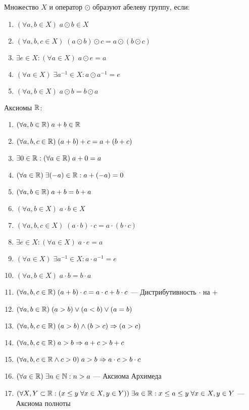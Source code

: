 \documentclass{article}
\begin{document}


Множество $X$ и оператор $\odot$ образуют абелеву группу, если:

\begin{enumerate}[label=\Roman*.]
	\item$(\forall a, b\in X)\;a\odot b\in X$
	\item$(\forall a,b,c\in X)\;(a\odot b)\odot c=a\odot(b\odot c)$
	\item$\exists e\in X:(\forall a\in X)\;a\odot e=a$
	\item$(\forall a\in X)\;\exists a^{-1}\in X:a\odot a^{-1}=e$
	\item$(\forall a, b\in X)\;a\odot b=b\odot a$
\end{enumerate}


Аксиомы $\mathbb{R}$:

\begin{enumerate}[label=\Roman*.]
	\item{}$(\forall a, b\in\mathbb{R})\;a+b\in\mathbb{R}$
	\item$(\forall a,b,c\in\mathbb{R})\;(a+b)+c=a+(b+c)$
	\item$\exists 0\in\mathbb{R}:(\forall a\in\mathbb{R})\;a+0=a$
	\item$(\forall a\in\mathbb{R})\;\exists (-a)\in\mathbb{R}:a+(-a)=0$
	\item{}$(\forall a, b\in\mathbb{R})\;a+b=b+a$
	\item{}$(\forall a, b\in X)\;a\cdot b\in X$
	\item$(\forall a,b,c\in X)\;(a\cdot b)\cdot c=a\cdot(b\cdot c)$
	\item$\exists e\in X:(\forall a\in X)\;a\cdot e=a$
	\item$(\forall a\in X)\;\exists a^{-1}\in X:a\cdot a^{-1}=e$
	\item{}$(\forall a, b\in X)\;a\cdot b=b\cdot a$
	\item$(\forall a,b,c\in\mathbb{R})\;(a+b)\cdot c=a\cdot c+b\cdot c$ --- Дистрибутивность $\cdot$ на $+$
	\item{}$(\forall a,b\in\mathbb{R})\;(a>b)\lor (a<b)\lor (a=b)$
	\item$(\forall a,b,c\in\mathbb{R})\;(a>b)\land(b>c)\Rightarrow (a>c)$
	\item$(\forall a,b,c\in\mathbb{R})\;a>b\Rightarrow a+c>b+c$
	\item{}$(\forall a,b,c\in\mathbb{R} \land c>0)\;a>b\Rightarrow a\cdot c>b\cdot c$
	\item$(\forall a\in\mathbb{R})\;\exists n\in\mathbb{N}:n>a$ --- Аксиома Архимеда
	\item$(\forall X,Y\subset\mathbb{R}:(x\leq y\;\forall x\in X,y\in Y))\;
		\exists a\in\mathbb{R}: x\leq a\leq y\;\forall x\in X,y\in Y$ --- Аксиома полноты
\end{enumerate}
\end{document}
